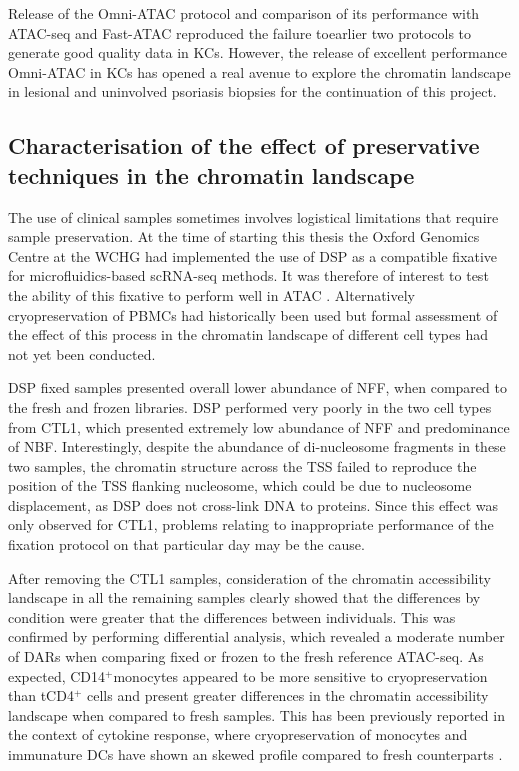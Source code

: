 Release of the Omni-ATAC protocol and comparison of its performance with ATAC-seq and Fast-ATAC reproduced the failure toearlier two protocols to generate good quality data in KCs. However, the release of excellent performance Omni-ATAC in KCs has opened a real avenue to explore the chromatin landscape in lesional and uninvolved psoriasis biopsies for the continuation of this project.


\subsection{Characterisation of the effect of preservative techniques in the chromatin landscape}
The use of clinical samples sometimes involves logistical limitations that require sample preservation. At the time of starting this thesis the Oxford Genomics Centre at the WCHG had implemented the use of DSP as a compatible fixative for microfluidics-based scRNA-seq methods. It was therefore of interest to test the ability of this fixative to perform well in ATAC \parencite{Attar2018}. Alternatively cryopreservation of PBMCs had historically been used but formal assessment of the effect of this process in the chromatin landscape of different cell types had not yet been conducted.

DSP fixed samples presented overall lower abundance of NFF, when compared to the fresh and frozen libraries. DSP performed very poorly in the two cell types from CTL1, which presented extremely low abundance of NFF and predominance of NBF. Interestingly, despite the abundance of di-nucleosome fragments in these two samples, the chromatin structure across the TSS failed to reproduce the position of the TSS flanking nucleosome, which could be due to nucleosome displacement, as DSP does not cross-link DNA to proteins. Since this effect was only observed for CTL1, problems relating to inappropriate performance of the fixation protocol on that particular day may be the cause.

After removing the CTL1 samples, consideration of the chromatin accessibility landscape in all the remaining samples clearly showed that the differences by condition were greater that the differences between individuals. This was confirmed by performing differential analysis, which revealed a moderate number of DARs when comparing fixed or frozen to the fresh reference ATAC-seq. As expected, CD14$^+$monocytes appeared to be more sensitive to cryopreservation than tCD4$^+$ cells and present greater differences in the chromatin accessibility landscape when compared to fresh samples. This has been previously reported in the context of cytokine response, where cryopreservation of monocytes and immunature DCs have shown an skewed profile compared to fresh counterparts \parencite{Meijerink2011}. 

